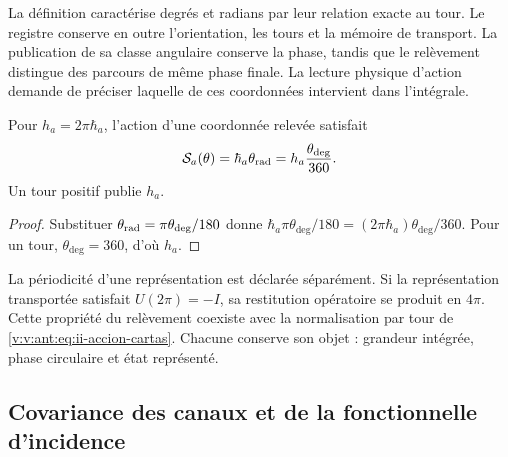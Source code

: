 La définition caractérise degrés et radians par leur relation exacte
au tour. Le registre conserve en outre l'orientation, les tours et
la mémoire de transport. La publication de sa classe angulaire conserve
la phase, tandis que le relèvement distingue des parcours de même
phase finale. La lecture physique d'action demande de préciser laquelle de
ces coordonnées intervient dans l'intégrale.

\begin{proposition}
Pour \(h_a=2\pi\hbar_a\), l'action d'une coordonnée relevée
satisfait
\begin{equation}
 \mathcal S_a(\theta)
 =\hbar_a\theta_{\rm rad}
 =h_a\frac{\theta_{\deg}}{360}.
 \label{v:v:ant:eq:ii-accion-cartas}
\end{equation}
Un tour positif publie \(h_a\).
\end{proposition}
\begin{proof}
Substituer \(\theta_{\rm rad}=\pi\theta_{\deg}/180\) donne
\(\hbar_a\pi\theta_{\deg}/180
=(2\pi\hbar_a)\theta_{\deg}/360\). Pour un tour,
\(\theta_{\deg}=360\), d'où \(h_a\).
\end{proof}

La périodicité d'une représentation est déclarée séparément. Si la
représentation transportée satisfait \(U(2\pi)=-I\), sa restitution
opératoire se produit en \(4\pi\). Cette propriété du relèvement
coexiste avec la normalisation par tour de
\eqref{v:v:ant:eq:ii-accion-cartas}. Chacune conserve son objet : grandeur
intégrée, phase circulaire et état représenté.

\subsection{Covariance des canaux et de la fonctionnelle d'incidence}

